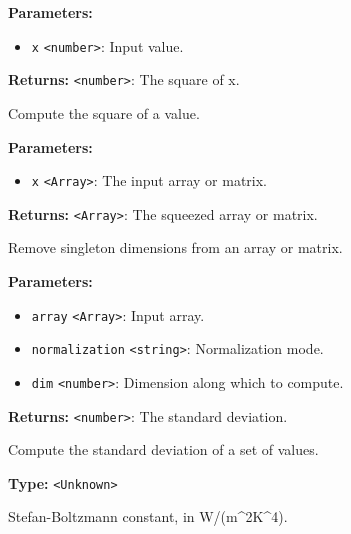 \documentclass[12pt,a4paper]{article}
\begin{document}
\noindent \textbf{Parameters:}
\begin{itemize}
  \item \texttt{x} \texttt{<number>}: Input value.
\end{itemize}

\noindent \textbf{Returns:} \texttt{<number>}: The square of x.

\noindent Compute the square of a value.

\vspace{5mm}
\noindent {}


\noindent \textbf{Parameters:}
\begin{itemize}
  \item \texttt{x} \texttt{<Array>}: The input array or matrix.
\end{itemize}

\noindent \textbf{Returns:} \texttt{<Array>}: The squeezed array or matrix.

\noindent Remove singleton dimensions from an array or matrix.

\vspace{5mm}
\noindent {}


\noindent \textbf{Parameters:}
\begin{itemize}
  \item \texttt{array} \texttt{<Array>}: Input array.
  \item \texttt{normalization} \texttt{<string>}: Normalization mode.
  \item \texttt{dim} \texttt{<number>}: Dimension along which to compute.
\end{itemize}

\noindent \textbf{Returns:} \texttt{<number>}: The standard deviation.

\noindent Compute the standard deviation of a set of values.

\vspace{5mm}
\noindent {}\vspace{4mm}


\noindent \textbf{Type:} \texttt{<Unknown>}

\noindent Stefan-Boltzmann constant, in W/(m\textasciicircum{}2K\textasciicircum{}4).
\end{document}
